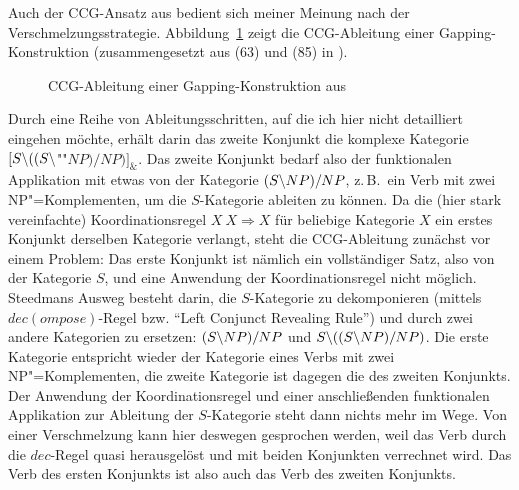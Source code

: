 Auch der CCG-Ansatz aus \cite{Steedman:90} bedient sich meiner Meinung nach der Verschmelzungsstrategie. Abbildung~\ref{fig-ellipse-ccg} zeigt die CCG-Ableitung einer Gapping-Konstruktion (zusammengesetzt aus (63) und (85) in \citealt{Steedman:90}). 
\begin{figure}[t]
\centering
\newcommand{\ccghspc}{-0.7em} 
\caption{\label{fig-ellipse-ccg}CCG-Ableitung einer Gapping-Konstruktion aus \citet[(63),(85)]{Steedman:90}}
\end{figure}
Durch eine Reihe von Ableitungsschritten, auf die ich hier nicht detailliert eingehen möchte, erhält darin das zweite Konjunkt die komplexe Kategorie $[S\backslash ((S\backslash$""$\mathit{NP})/\mathit{NP})]_\&$. Das zweite Konjunkt bedarf also der funktionalen Applikation mit etwas von der Kategorie $(S\backslash NP)/NP$, z.\,B.\ ein Verb mit zwei NP"=Komplementen, um die $S$-Kategorie ableiten zu können. Da die (hier stark vereinfachte) Koordinationsregel $X ~ X \Rightarrow X$ für beliebige Kategorie $X$ ein erstes Konjunkt derselben Kategorie verlangt, steht die CCG-Ableitung zunächst vor einem Problem: Das erste Konjunkt ist nämlich ein vollständiger Satz, also von der Kategorie $S$, und eine Anwendung der Koordinationsregel nicht möglich. Steedmans Ausweg besteht darin, die $S$-Kategorie zu dekomponieren (mittels $dec(ompose)$-Regel bzw. "`Left Conjunct Revealing Rule"') und durch zwei andere Kategorien zu ersetzen: $(S\backslash NP)/NP$ und $S\backslash((S\backslash NP)/NP)$. Die erste Kategorie entspricht wieder der Kategorie eines Verbs mit zwei NP"=Komplementen, die zweite Kategorie ist dagegen die des zweiten Konjunkts. Der Anwendung der Koordinationsregel und einer anschlie\ss enden funktionalen Applikation zur Ableitung der $S$-Kategorie steht dann nichts mehr im Wege. Von einer Verschmelzung kann hier deswegen gesprochen werden, weil das Verb durch die $dec$-Regel quasi herausgelöst und mit beiden Konjunkten verrechnet wird. Das Verb des ersten Konjunkts ist also auch das Verb des zweiten Konjunkts. 

